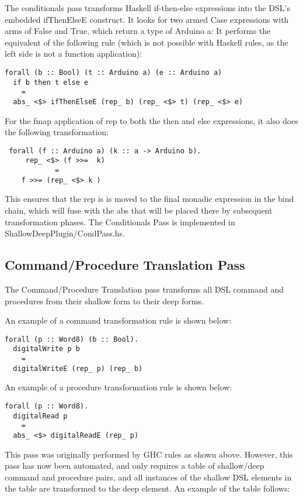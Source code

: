 \documentclass[11pt, oneside]{article}   	%
\begin{document}
The conditionals pass transforms Haskell if-then-else expressions into the DSL's
embedded ifThenElseE construct.  It looks for two armed Case expressions with
arms of False and True, which return a type of Arduino a:  It performs the equivalent
of the following rule (which is not possible with Haskell rules, as the left side is not
a function application):

\begin{verbatim}
forall (b :: Bool) (t :: Arduino a) (e :: Arduino a)
  if b then t else e
    =
  abs_ <$> ifThenElseE (rep_ b) (rep_ <$> t) (rep_ <$> e)
\end{verbatim}

For the fmap application of rep to both the then and else expressions, it also
does the following transformation:

\begin{verbatim}
 forall (f :: Arduino a) (k :: a -> Arduino b).
     rep_ <$> (f >>=  k)
            =
    f >>= (rep_ <$> k )
\end{verbatim}

This ensures that the rep is is moved to the final monadic expression in the bind chain,
which will fuse with the abs that will be placed there by subsequent transformation
phases.
The Conditionals Pass is implemented in ShallowDeepPlugin/CondPass.hs.

\subsection{Command/Procedure Translation Pass}

The Command/Procedure Translation pass transforms all DSL command and procedures from their 
shallow form to their deep forms.

An example of a command transformation rule is shown below:

\begin{verbatim}
forall (p :: Word8) (b :: Bool).  
  digitalWrite p b  
    =  
  digitalWriteE (rep_ p) (rep_ b)  
\end{verbatim}

An example of a procedure transformation rule is shown below:

\begin{verbatim}
forall (p :: Word8).
  digitalRead p 
    =  
  abs_ <$> digitalReadE (rep_ p)
 \end{verbatim}

This pass was originally performed by GHC rules as shown above.  However,
this pass has now been automated, and only requires a table of shallow/deep
command and procedure pairs, and all instances of the shallow DSL elements
in the table are transformed to the deep element. An example of the table follows:
\end{document}

